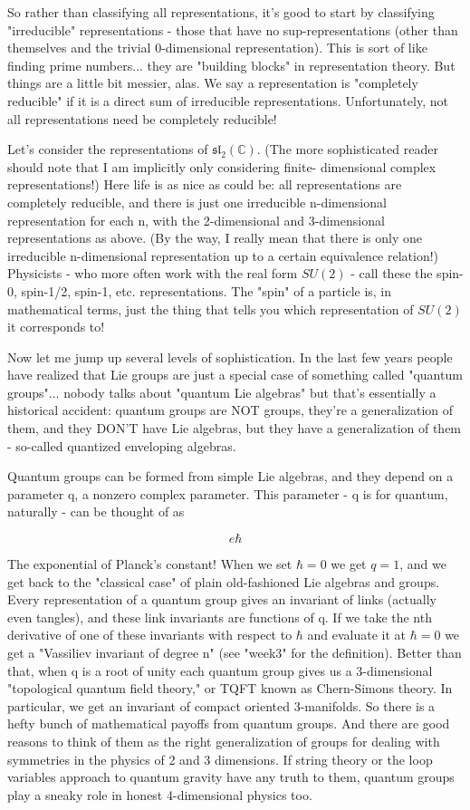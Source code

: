 So rather than classifying all representations, it's good to start by classifying "irreducible" representations - those that have no sup-representations (other than themselves and the trivial 0-dimensional representation). This is sort of like finding prime numbers... they are "building blocks" in representation theory. But things are a little bit messier, alas. We say a representation is "completely reducible" if it is a direct sum of irreducible representations. Unfortunately, not all representations need be completely reducible!

Let's consider the representations of $\mathfrak{sl}_2(\mathbb{C})$. (The more sophisticated reader should note that I am implicitly only considering finite- dimensional complex representations!) Here life is as nice as could be: all representations are completely reducible, and there is just one irreducible n-dimensional representation for each n, with the 2-dimensional and 3-dimensional representations as above. (By the way, I really mean that there is only one irreducible n-dimensional representation up to a certain equivalence relation!) Physicists - who more often work with the real form $SU(2)$ - call these the spin-0, spin-1/2, spin-1, etc. representations. The "spin" of a particle is, in mathematical terms, just the thing that tells you which representation of $SU(2)$ it corresponds to!

Now let me jump up several levels of sophistication. In the last few years people have realized that Lie groups are just a special case of something called "quantum groups"... nobody talks about "quantum Lie algebras" but that's essentially a historical accident: quantum groups are NOT groups, they're a generalization of them, and they DON'T have Lie algebras, but they have a generalization of them - so-called quantized enveloping algebras.

Quantum groups can be formed from simple Lie algebras, and they depend on a parameter q, a nonzero complex parameter. This parameter - q is for quantum, naturally - can be thought of as

$$e\hbar$$

The exponential of Planck's constant! When we set $\hbar = 0$ we get $q = 1$, and we get back to the "classical case" of plain old-fashioned Lie algebras and groups. Every representation of a quantum group gives an invariant of links (actually even tangles), and these link invariants are functions of q. If we take the nth derivative of one of these invariants with respect to $\hbar$ and evaluate it at $\hbar = 0$ we get a "Vassiliev invariant of degree n" (see "week3" for the definition). Better than that, when q is a root of unity each quantum group gives us a 3-dimensional "topological quantum field theory," or TQFT known as Chern-Simons theory. In particular, we get an invariant of compact oriented 3-manifolds. So there is a hefty bunch of mathematical payoffs from quantum groups. And there are good reasons to think of them as the right generalization of groups for dealing with symmetries in the physics of 2 and 3 dimensions. If string theory or the loop variables approach to quantum gravity have any truth to them, quantum groups play a sneaky role in honest 4-dimensional physics too.

